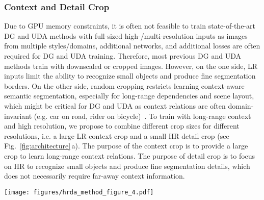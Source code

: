 \documentclass[journal,compsoc]{IEEEtran}
\begin{document}
\subsubsection{Context and Detail Crop}
\label{sec:context_detail_crop}

Due to GPU memory constraints, it is often not feasible to train state-of-the-art DG and UDA methods with full-sized high-/multi-resolution inputs as images from multiple styles/domains, additional networks, and additional losses are often required for DG and UDA training. Therefore, most previous DG and UDA methods train with downscaled or cropped images. 
However, on the one side, LR inputs limit the ability to recognize small objects and produce fine segmentation borders. On the other side, random cropping restricts learning context-aware semantic segmentation, especially for long-range dependencies and scene layout, which might be critical for DG and UDA as context relations are often domain-invariant (e.g. car on road, rider on bicycle)~\cite{huang2020contextual, yang2021context}.
To train with long-range context and high resolution, we propose to combine different crop sizes for different resolutions, i.e. a large LR context crop and a small HR detail crop (see Fig.~\ref{fig:architecture}\,a). The purpose of the context crop is to provide a large crop to learn long-range context relations. The purpose of detail crop is to focus on HR to recognize small objects and produce fine segmentation details, which does not necessarily require far-away context information.

\begin{figure*}
\centering

\begin{minipage}[t]{0.78\linewidth}
\vspace{0pt}
\texttt{[image: figures/hrda\_method\_figure\_4.pdf]}
\end{minipage}\hfill
\begin{minipage}[t]{0.2\linewidth}
\vspace{0pt}
\caption{(a) Multi-resolution training with low-resolution (LR) context and high-resolution (HR) detail crop. The prediction of the detail crop is fused into the context prediction within the region where it was cropped from by a learned scale attention. (b) For pseudo-label generation in UDA, multiple detail crops are generated using overlapping slide inference to cover the entire context crop. The pseudo-label is fused from HR pred.  and LR pred.  with the full attention  similar to (a) (see Sec.~\ref{sec:overlapping_slide_inference}). 
}
\label{fig:architecture}
\end{minipage}

\end{figure*}
\end{document}

